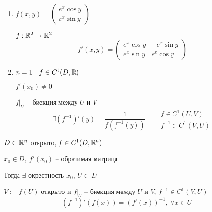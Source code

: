     \begin{illustration}\leavevmode
        \begin{enumerate}
            \item $f(x, y) = \begin{pmatrix}e^x \cos y \\ e^x \sin y \end{pmatrix}$
            \par $f : \mathbb{R}^2 \rightarrow \mathbb{R}^2$
            \[
                f'(x, y) = \begin{pmatrix} e^x\cos y & - e^x\sin y \\ e^x\sin y & e^x\cos y \end{pmatrix}    
            \]
            \item $n = 1 \quad f \in C^1(D, \mathbb{R})$
            \par $f'(x_0) \not= 0$
            \par $f\big|_U$ -- биекция между $U$ и $V$
            \[
                \exists (f^{-1})'(y) = \frac{1}{f(f^{-1}(y))} \quad \begin{aligned} &f \in C^1(U, V) \\ &f^{-1} \in C^1(V, U) \end{aligned}    
            \]
        \end{enumerate}
    \end{illustration}

    \begin{theorem}
        $D \subset \mathbb{R}^n$ открыто, $f \in C^1(D, \mathbb{R}^n)$
        \par $x_0 \in D, \ f'(x_0)$ -- обратимая матрица
        \par Тогда $\exists$ окрестность $x_0, \> U \subset D$
        \par $V := f(U)$ открыто и $f\big|_U$ -- биекция между $U$ и $V$, $f^{-1} \in C^1(V, U)$
        \[
            (f^{-1})'(f(x)) = (f'(x))^{-1}, \ \forall x \in U %
        \]
    \end{theorem}

